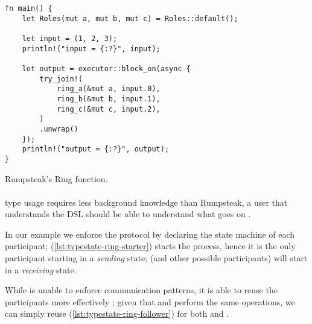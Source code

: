 \begin{listing}
    \begin{verbatim}
fn main() {
    let Roles(mut a, mut b, mut c) = Roles::default();

    let input = (1, 2, 3);
    println!("input = {:?}", input);

    let output = executor::block_on(async {
        try_join!(
            ring_a(&mut a, input.0),
            ring_b(&mut b, input.1),
            ring_c(&mut c, input.2),
        )
        .unwrap()
    });
    println!("output = {:?}", output);
}
    \end{verbatim}
    \caption{Rumpsteak's Ring  function.}
    \label{lst:rumpsteak-ring-main}
\end{listing}

\paragraph{} type usage requires less background knowledge than Rumpsteak,
a user that understands the \gls{DSL} should be able to understand what goes on .

In our example we enforce the protocol by declaring the state machine of each participant;
 (\autoref{lst:typestate-ring-starter}) starts the process,
hence it is the only participant starting in a \emph{sending} state;
 (and other possible participants) will start in a \emph{receiving} state.

While  is unable to enforce communication patterns,
it is able to reuse the participants more effectively ;
given that  and  perform the same operations, we can simply reuse  (\autoref{lst:typestate-ring-follower})
for both  and .


